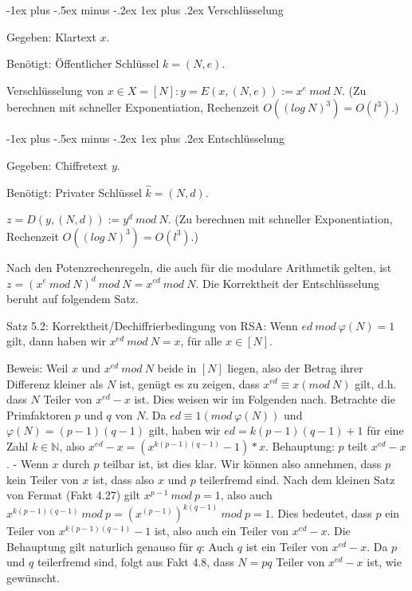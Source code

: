 \documentclass[a4paper]{article}
\makeatletter
\renewcommand{\subsubsection}{\@startsection{subsubsection}{3}{0mm}%
 {-1ex plus -.5ex minus -.2ex}%
 {1ex plus .2ex}%
 {\normalfont\small\bfseries}}
\makeatother
\begin{document}
\begin{multicols}{3}
        \subsubsection{Verschlüsselung}
        \begin{itemize*}
            \item Gegeben: Klartext $x$.
            \item Benötigt: Öffentlicher Schlüssel $k= (N,e)$.
        \end{itemize*}

        Verschlüsselung von $x\in X= [N]: y=E(x,(N,e)) :=x^e\ mod\ N$. (Zu berechnen mit schneller Exponentiation, Rechenzeit $O((log\ N)^3) =O(l^3)$.)

        \subsubsection{Entschlüsselung}
        \begin{itemize*}
            \item Gegeben: Chiffretext $y$.
            \item Benötigt: Privater Schlüssel $\hat{k}= (N,d)$.
        \end{itemize*}

    $z=D(y,(N,d)) :=y^d\ mod\ N$. (Zu berechnen mit schneller Exponentiation, Rechenzeit $O((log\ N)^3) =O(l^3)$.)

        Nach den Potenzrechenregeln, die auch für die modulare Arithmetik gelten, ist $z=(x^e\ mod\ N)^d\ mod\ N=x^{ed}\ mod\ N$. Die Korrektheit der Entschlüsselung beruht auf folgendem Satz.

        Satz 5.2: Korrektheit/Dechiffrierbedingung von RSA: Wenn $ed\ mod\ \varphi(N) = 1$ gilt, dann haben wir $x^{ed}\ mod\ N=x$, für alle $x\in [N]$.

        Beweis: Weil $x$ und $x^{ed}\ mod\ N$ beide in $[N]$ liegen, also der Betrag ihrer Differenz kleiner als $N$ ist, genügt es zu zeigen, dass $x^{ed} \equiv x(mod\ N)$ gilt, d.h. dass $N$ Teiler von $x^{ed}-x$ ist.
        Dies weisen wir im Folgenden nach. Betrachte die Primfaktoren $p$ und $q$ von $N$. Da $ed\equiv 1 (mod\ \varphi(N))$ und $\varphi(N) = (p-1)(q-1)$ gilt, haben wir $ed=k(p-1)(q-1) + 1$ für eine Zahl $k\in\mathbb{N}$, also $x^{ed}-x= (x^{k(p-1)(q-1)} -1)*x$.
        Behauptung: $p$ teilt $x^{ed}-x$. - Wenn $x$ durch $p$ teilbar ist, ist dies klar. Wir können also annehmen, dass $p$ kein Teiler von $x$ ist, dass also $x$ und $p$ teilerfremd sind. Nach dem kleinen Satz von Fermat (Fakt 4.27) gilt $x^{p-1}\ mod\ p= 1$, also auch $x^{k(p-1)(q-1)}\ mod\ p= (x^{(p-1)})^{k(q-1)}\ mod\ p= 1$.
        Dies bedeutet, dass $p$ ein Teiler von $x^{k(p-1)(q-1)}-1$ ist, also auch ein Teiler von $x^{ed}-x$.
        Die Behauptung gilt naturlich genauso für $q$: Auch $q$ ist ein Teiler von $x^{ed}-x$. Da $p$ und $q$ teilerfremd sind, folgt aus Fakt 4.8, dass $N=pq$ Teiler von $x^{ed}-x$ ist, wie gewünscht.


\end{multicols}
\end{document}
